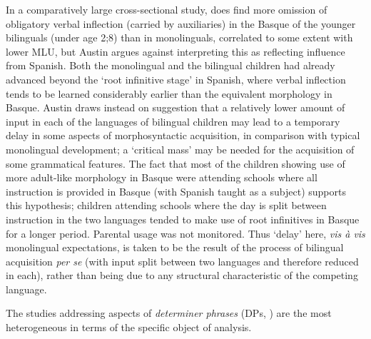 \documentclass[output=paper]{langscibook}
\begin{document}
In a comparatively large cross-sectional study, \citet{Austin2009} does find more omission of obligatory verbal inflection (carried by auxiliaries) in the Basque of the younger bilinguals (under age 2;8) than in monolinguals, correlated to some extent with lower MLU, but Austin argues against interpreting this as reflecting influence from Spanish. Both the monolingual and the bilingual children had already advanced beyond the ‘root infinitive stage’ in Spanish, where verbal inflection tends to be learned considerably earlier than the equivalent morphology in Basque. Austin draws instead on  suggestion that a relatively lower amount of input in each of the languages of bilingual children may lead to a temporary delay in some aspects of morphosyntactic acquisition, in comparison with typical monolingual development; a ‘critical mass’ may be needed for the acquisition of some grammatical features. The fact that most of the children showing use of more adult-like morphology in Basque were attending schools where all instruction is provided in Basque (with Spanish taught as a subject) supports this hypothesis; children attending schools where the day is split between instruction in the two languages tended to make use of root infinitives in Basque for a longer period. Parental usage was not monitored. Thus ‘delay’ here, \textit{vis à vis} monolingual expectations, is taken to be the result of the process of bilingual acquisition \textit{per se} (with input split between two languages and therefore reduced in each), rather than being due to any structural characteristic of the competing language.

The studies addressing aspects of \textit{determiner phrases} (DPs, ) are the most heterogeneous in terms of the specific object of analysis.
\end{document}
